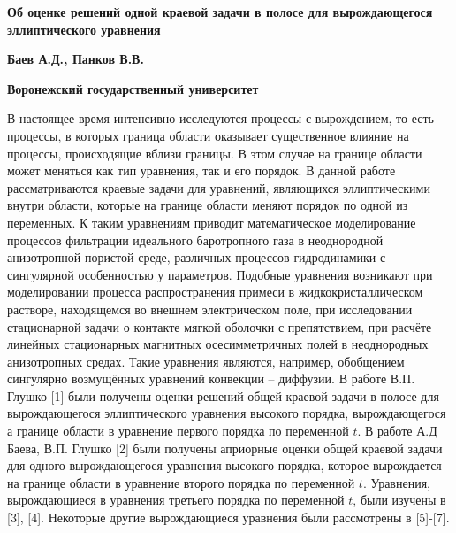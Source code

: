 \begin{center}
\textbf{Об оценке решений одной краевой задачи в полосе для вырождающегося
эллиптического уравнения}
\end{center}

\begin{center}
\textbf{Баев А.Д., Панков В.В. }
\end{center}

\begin{center}
\textbf{Воронежский государственный университет}
\end{center}





В настоящее время интенсивно исследуются процессы с вырождением, то есть
процессы, в которых граница области оказывает существенное влияние на
процессы, происходящие вблизи границы. В этом случае на границе области
может меняться как тип уравнения, так и его порядок. В данной работе
рассматриваются краевые задачи для уравнений, являющихся эллиптическими
внутри области, которые на границе области меняют порядок по одной из
переменных. К таким уравнениям приводит математическое моделирование
процессов фильтрации идеального баротропного газа в неоднородной
анизотропной пористой среде, различных процессов гидродинамики с сингулярной
особенностью у параметров. Подобные уравнения возникают при моделировании
процесса распространения примеси в жидкокристаллическом растворе,
находящемся во внешнем электрическом поле, при исследовании стационарной
задачи о контакте мягкой оболочки с препятствием, при расчёте линейных
стационарных магнитных осесимметричных полей в неоднородных анизотропных
средах. Такие уравнения являются, например, обобщением сингулярно
возмущённых уравнений конвекции -- диффузии. В работе В.П. Глушко [1] были
получены оценки решений общей краевой задачи в полосе для вырождающегося
эллиптического уравнения высокого порядка, вырождающегося а границе области
в уравнение первого порядка по переменной $t$. В работе А.Д Баева, В.П.
Глушко [2] были получены априорные оценки общей краевой задачи для одного
вырождающегося уравнения высокого порядка, которое вырождается на границе
области в уравнение второго порядка по переменной $t$. Уравнения,
вырождающиеся в уравнения третьего порядка по переменной $t$, были изучены в
[3], [4]. Некоторые другие вырождающиеся уравнения были рассмотрены в
[5]-[7].

